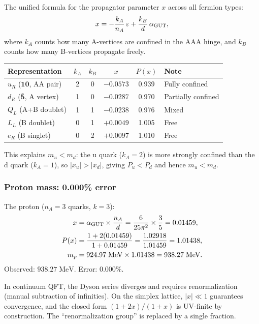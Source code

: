The unified formula for the propagator parameter $x$ across all fermion types:
\begin{equation}
x = -\frac{k_A}{n_A}\,\varepsilon + \frac{k_B}{d}\,\alpha_{\mathrm{GUT}},
\end{equation}
where $k_A$ counts how many A-vertices are confined in the AAA hinge, and $k_B$ counts how many B-vertices propagate freely.

\begin{center}
\begin{tabular}{lccccl}
\hline
Representation & $k_A$ & $k_B$ & $x$ & $P(x)$ & Note \\
\hline
$u_R$ ($\mathbf{10}$, AA pair) & 2 & 0 & $-0.0573$ & 0.939 & Fully confined \\
$d_R$ ($\bar{\mathbf{5}}$, A vertex) & 1 & 0 & $-0.0287$ & 0.970 & Partially confined \\
$Q_L$ (A+B doublet) & 1 & 1 & $-0.0238$ & 0.976 & Mixed \\
$L_L$ (B doublet) & 0 & 1 & $+0.0049$ & 1.005 & Free \\
$e_R$ (B singlet) & 0 & 2 & $+0.0097$ & 1.010 & Free \\
\hline
\end{tabular}
\end{center}

This explains $m_u < m_d$: the u quark ($k_A = 2$) is more strongly confined than the d quark ($k_A = 1$), so $|x_u| > |x_d|$, giving $P_u < P_d$ and hence $m_u < m_d$.

\subsubsection{Proton mass: 0.000\% error}

The proton ($n_A = 3$ quarks, $k = 3$):
\begin{align}
x &= \alpha_{\mathrm{GUT}} \times \frac{n_A}{d} = \frac{6}{25\pi^2} \times \frac{3}{5} = 0.01459, \\
P(x) &= \frac{1 + 2(0.01459)}{1 + 0.01459} = \frac{1.02918}{1.01459} = 1.01438, \\
m_p &= 924.97\;\text{MeV} \times 1.01438 = 938.27\;\text{MeV}.
\end{align}
Observed: $938.27\;\text{MeV}$.  Error: $\mathbf{0.000\%}$.

\begin{remark}
In continuum QFT, the Dyson series diverges and requires renormalization (manual subtraction of infinities).  On the simplex lattice, $|x| \ll 1$ guarantees convergence, and the closed form $(1+2x)/(1+x)$ is UV-finite by construction.  The ``renormalization group'' is replaced by a single fraction.
\end{remark}

